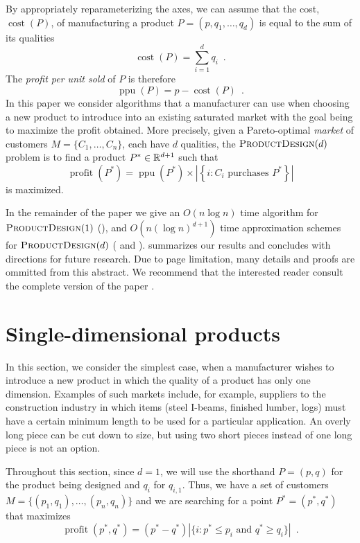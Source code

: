 \documentclass{llncs}
\newcommand{\cost}{\operatorname{cost}}
\newcommand{\ppu}{\operatorname{ppu}}
\newcommand{\val}{\operatorname{profit}}
\begin{document}
By appropriately reparameterizing the axes, we can assume that the cost,
$\cost(P)$, of manufacturing a product $P=(p,q_1,\ldots,q_d)$ is equal to
the sum of its qualities
\[
   \cost(P) = \sum_{i=1}^d q_i \enspace .
\]
The \emph{profit per unit sold} of $P$ is therefore
\[
   \ppu(P) = p-\cost(P) \enspace .
\]
In this paper we consider algorithms that a manufacturer can use when
choosing a new product to introduce into an existing saturated market
with the goal being to maximize the profit obtained.  More precisely,
given a Pareto-optimal \emph{market} of customers $M=\{C_1,\ldots,C_n\}$,
each have $d$ qualities, the $\textsc{ProductDesign}(d)$ problem is to
find a product $P^*\in\mathbb{R}^{d+1}$ such that
\[
  \val(P^*) = \ppu(P^*)
    \times 
      \left| \left\{ i:\mbox{$C_i$ purchases $P^*$} \right\} \right|
\]
is maximized.  

In the remainder of the paper we give an $O(n\log n)$ time algorithm
for $\textsc{ProductDesign}(1)$ (), and $O(n(\log n)^{d+1})$
time approximation schemes for $\textsc{ProductDesign}(d)$ (
and ).   summarizes our results and
concludes with directions for future research.  Due to page limitation,
many details and proofs are ommitted from this abstract.  We 
recommend that the interested reader consult the complete version of the paper
\cite{pricing_arxiv}.

\section{Single-dimensional products}

In this section, we consider the simplest case, when a manufacturer
wishes to introduce a new product in which the quality of a product
has only one dimension.  Examples of such markets include, for example,
suppliers to the construction industry in which items (steel I-beams,
finished lumber, logs) must have a certain minimum length to be used for
a particular application.  An overly long piece can be cut down to size,
but using two short pieces instead of one long piece is not an option.

Throughout this section, since $d=1$, we will use the shorthand $P=(p,q)$
for the product being designed and $q_i$ for $q_{i,1}$.  Thus, we have a
set of customers $M=\{(p_1,q_1),\ldots,(p_{n},q_n)\}$ and we are searching
for a point $P^*=(p^*,q^*)$ that maximizes 
\[
   \val(p^*,q^*) = (p^*-q^*)
     |\{i : \mbox{$p^*\le p_i$ and $q^*\ge q_i$}\}|  \enspace .
\]
\end{document}
